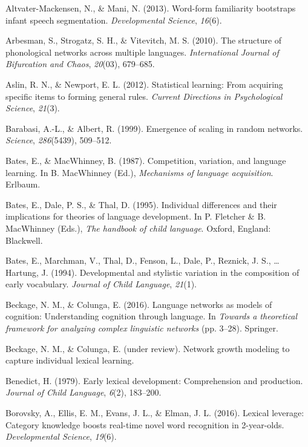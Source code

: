\documentclass[english,floatsintext,man]{apa6}
\theoremstyle{definition}
\theoremstyle{definition}
\theoremstyle{definition}
\theoremstyle{remark}
\begin{document}
\hypertarget{refs}{}
\hypertarget{ref-altvater2013}{}
Altvater-Mackensen, N., \& Mani, N. (2013). Word-form familiarity
bootstraps infant speech segmentation. \emph{Developmental Science},
\emph{16}(6).

\hypertarget{ref-arbesman2010}{}
Arbesman, S., Strogatz, S. H., \& Vitevitch, M. S. (2010). The structure
of phonological networks across multiple languages. \emph{International
Journal of Bifurcation and Chaos}, \emph{20}(03), 679--685.

\hypertarget{ref-aslin2012}{}
Aslin, R. N., \& Newport, E. L. (2012). Statistical learning: From
acquiring specific items to forming general rules. \emph{Current
Directions in Psychological Science}, \emph{21}(3).

\hypertarget{ref-barabasi99}{}
Barabasi, A.-L., \& Albert, R. (1999). Emergence of scaling in random
networks. \emph{Science}, \emph{286}(5439), 509--512.

\hypertarget{ref-bates1987}{}
Bates, E., \& MacWhinney, B. (1987). Competition, variation, and
language learning. In B. MacWhinney (Ed.), \emph{Mechanisms of language
acquisition}. Erlbaum.

\hypertarget{ref-bates1995}{}
Bates, E., Dale, P. S., \& Thal, D. (1995). Individual differences and
their implications for theories of language development. In P. Fletcher
\& B. MacWhinney (Eds.), \emph{The handbook of child language}. Oxford,
England: Blackwell.

\hypertarget{ref-bates1994}{}
Bates, E., Marchman, V., Thal, D., Fenson, L., Dale, P., Reznick, J. S.,
\ldots{} Hartung, J. (1994). Developmental and stylistic variation in
the composition of early vocabulary. \emph{Journal of Child Language},
\emph{21}(1).

\hypertarget{ref-beckage2016}{}
Beckage, N. M., \& Colunga, E. (2016). Language networks as models of
cognition: Understanding cognition through language. In \emph{Towards a
theoretical framework for analyzing complex linguistic networks} (pp.
3--28). Springer.

\hypertarget{ref-beckage}{}
Beckage, N. M., \& Colunga, E. (under review). Network growth modeling
to capture individual lexical learning.

\hypertarget{ref-benedict1979}{}
Benedict, H. (1979). Early lexical development: Comprehension and
production. \emph{Journal of Child Language}, \emph{6}(2), 183--200.

\hypertarget{ref-borovsky2016}{}
Borovsky, A., Ellis, E. M., Evans, J. L., \& Elman, J. L. (2016).
Lexical leverage: Category knowledge boosts real-time novel word
recognition in 2-year-olds. \emph{Developmental Science}, \emph{19}(6).
\end{document}
